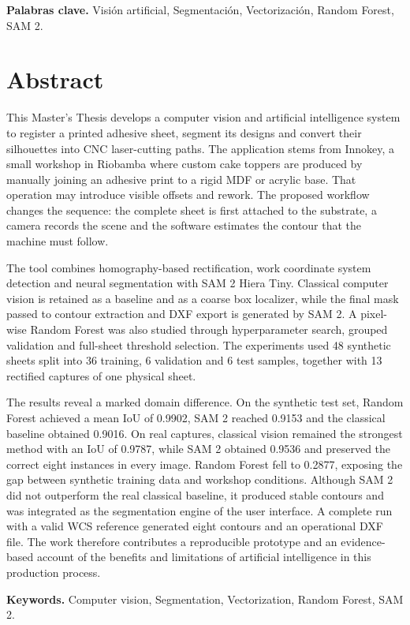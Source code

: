 \documentclass[11pt,a4paper,spanish]{book}
\numberwithin{equation}{chapter}
\numberwithin{figure}{chapter}
\numberwithin{table}{chapter}
\begin{document}
\textbf{Palabras clave.} Visión artificial, Segmentación, Vectorización, Random Forest, SAM 2.

\chapter*{Abstract}
This Master's Thesis develops a computer vision and artificial intelligence system to register a printed adhesive sheet, segment its designs and convert their silhouettes into CNC laser-cutting paths. The application stems from Innokey, a small workshop in Riobamba where custom cake toppers are produced by manually joining an adhesive print to a rigid MDF or acrylic base. That operation may introduce visible offsets and rework. The proposed workflow changes the sequence: the complete sheet is first attached to the substrate, a camera records the scene and the software estimates the contour that the machine must follow.

The tool combines homography-based rectification, work coordinate system detection and neural segmentation with SAM 2 Hiera Tiny. Classical computer vision is retained as a baseline and as a coarse box localizer, while the final mask passed to contour extraction and DXF export is generated by SAM 2. A pixel-wise Random Forest was also studied through hyperparameter search, grouped validation and full-sheet threshold selection. The experiments used 48 synthetic sheets split into 36 training, 6 validation and 6 test samples, together with 13 rectified captures of one physical sheet.

The results reveal a marked domain difference. On the synthetic test set, Random Forest achieved a mean IoU of 0.9902, SAM 2 reached 0.9153 and the classical baseline obtained 0.9016. On real captures, classical vision remained the strongest method with an IoU of 0.9787, while SAM 2 obtained 0.9536 and preserved the correct eight instances in every image. Random Forest fell to 0.2877, exposing the gap between synthetic training data and workshop conditions. Although SAM 2 did not outperform the real classical baseline, it produced stable contours and was integrated as the segmentation engine of the user interface. A complete run with a valid WCS reference generated eight contours and an operational DXF file. The work therefore contributes a reproducible prototype and an evidence-based account of the benefits and limitations of artificial intelligence in this production process.

\textbf{Keywords.} Computer vision, Segmentation, Vectorization, Random Forest, SAM 2.

\mainmatter









\appendix


\begingroup
\small


\endgroup
\end{document}
